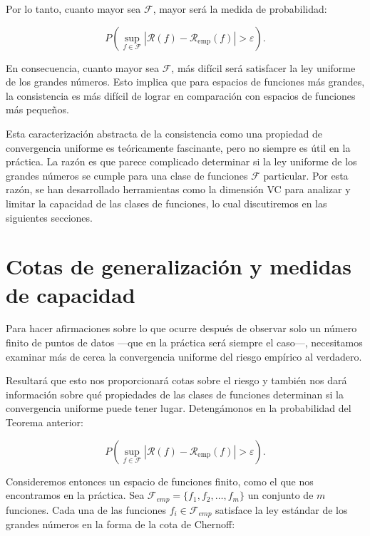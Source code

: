 \documentclass{report}
\begin{document}
Por lo tanto, cuanto mayor sea \(\mathcal{F}\), mayor será la medida de probabilidad:

\[
P\left(\sup_{f \in \mathcal{F}} |\mathcal{R}(f) - \mathcal{R}_{\text{emp}}(f)| > \varepsilon \right).
\]

En consecuencia, cuanto mayor sea \(\mathcal{F}\), más difícil será satisfacer la ley uniforme de los grandes números. 
Esto implica que para espacios de funciones más grandes, la consistencia es más difícil de lograr en comparación 
con espacios de funciones más pequeños.\newline


Esta caracterización abstracta de la consistencia como una propiedad de convergencia uniforme es teóricamente 
fascinante, pero no siempre es útil en la práctica. La razón es que parece complicado determinar si la ley uniforme 
de los grandes números se cumple para una clase de funciones \(\mathcal{F}\) particular. Por esta razón, se han desarrollado 
herramientas como la dimensión VC para analizar y limitar la capacidad de las clases de funciones, lo cual discutiremos 
en las siguientes secciones.\newline

\section{Cotas de generalización y medidas de capacidad}

Para hacer afirmaciones sobre lo que ocurre después de observar solo un número finito de puntos de datos 
—que en la práctica será siempre el caso—, necesitamos examinar más de cerca la 
convergencia uniforme del riesgo empírico al verdadero.\newline

Resultará que esto nos proporcionará cotas sobre el riesgo y también nos dará información sobre 
qué propiedades de las clases de funciones determinan si la convergencia uniforme puede tener lugar. Detengámonos
en la probabilidad del Teorema anterior:

\begin{equation}
P\left(\sup_{f \in \mathcal{F}} |\mathcal{R}(f) - \mathcal{R}_{\text{emp}}(f)| > \varepsilon \right). \label{eq:med_unif_riesgo_riesgo_emp}
\end{equation}

Consideremos entonces un espacio de funciones finito, como el que nos encontramos en la práctica. Sea
\(\mathcal{F}_{emp} = \{f_1, f_2, \dots, f_m\}\) un conjunto de \(m\) funciones. Cada una de las funciones 
\(f_i \in \mathcal{F}_{emp}\) satisface la ley estándar de los grandes números en la forma de la cota de Chernoff:
\end{document}

